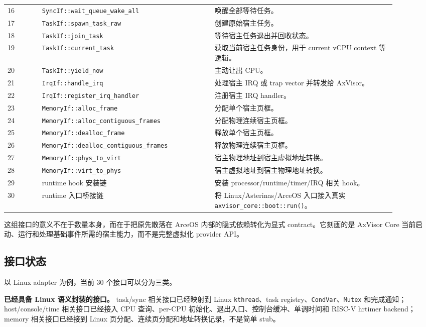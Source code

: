 \documentclass[a4paper,11pt]{article}
\begin{document}
\begin{longtable}{p{0.08\linewidth}p{0.40\linewidth}p{0.42\linewidth}}
16 & \texttt{SyncIf::wait\_queue\_wake\_all} & 唤醒全部等待任务。 \\
17 & \texttt{TaskIf::spawn\_task\_raw} & 创建原始宿主任务。 \\
18 & \texttt{TaskIf::join\_task} & 等待宿主任务退出并回收状态。 \\
19 & \texttt{TaskIf::current\_task} & 获取当前宿主任务身份，用于 current vCPU context 等逻辑。 \\
20 & \texttt{TaskIf::yield\_now} & 主动让出 CPU。 \\
21 & \texttt{IrqIf::handle\_irq} & 处理宿主 IRQ 或 trap vector 并转发给 AxVisor。 \\
22 & \texttt{IrqIf::register\_irq\_handler} & 注册宿主 IRQ handler。 \\
23 & \texttt{MemoryIf::alloc\_frame} & 分配单个宿主页框。 \\
24 & \texttt{MemoryIf::alloc\_contiguous\_frames} & 分配物理连续宿主页框。 \\
25 & \texttt{MemoryIf::dealloc\_frame} & 释放单个宿主页框。 \\
26 & \texttt{MemoryIf::dealloc\_contiguous\_frames} & 释放物理连续宿主页框。 \\
27 & \texttt{MemoryIf::phys\_to\_virt} & 宿主物理地址到宿主虚拟地址转换。 \\
28 & \texttt{MemoryIf::virt\_to\_phys} & 宿主虚拟地址到宿主物理地址转换。 \\
29 & runtime hook 安装链 & 安装 processor/runtime/timer/IRQ 相关 hook。 \\
30 & runtime 入口桥接链 & 将 Linux/Asterinas/ArceOS 入口接入真实 \texttt{axvisor\_core::boot::run()}。 \\
\bottomrule
\end{longtable}

这组接口的意义不在于数量本身，而在于把原先散落在 ArceOS 内部的隐式依赖转化为显式 contract。它刻画的是 AxVisor Core 当前启动、运行和处理基础事件所需的宿主能力，而不是完整虚拟化 provider API。

\subsection{接口状态}

以 Linux adapter 为例，当前 30 个接口可以分为三类。

\textbf{已经具备 Linux 语义封装的接口。}
task/sync 相关接口已经映射到 Linux \texttt{kthread}、task registry、\texttt{CondVar}、\texttt{Mutex} 和完成通知；host/console/time 相关接口已经接入 CPU 查询、per-CPU 初始化、退出入口、控制台缓冲、单调时间和 RISC-V hrtimer backend；memory 相关接口已经接到 Linux 页分配、连续页分配和地址转换记录，不是简单 stub。
\end{document}
